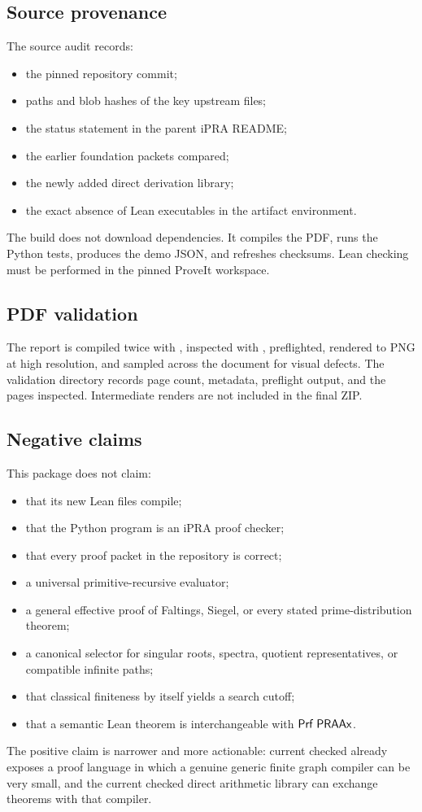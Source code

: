 \subsection{Source provenance}

The source audit records:

\begin{itemize}
\item the pinned repository commit;
\item paths and blob hashes of the key upstream files;
\item the status statement in the parent iPRA README;
\item the earlier foundation packets compared;
\item the newly added direct derivation library;
\item the exact absence of Lean executables in the artifact environment.
\end{itemize}

The build does not download dependencies.  It compiles the PDF, runs the Python
tests, produces the demo JSON, and refreshes checksums.  Lean checking must be
performed in the pinned ProveIt workspace.

\subsection{PDF validation}

The report is compiled twice with , inspected with
, preflighted, rendered to PNG at high resolution, and sampled
across the document for visual defects.  The validation directory records page
count, metadata, preflight output, and the pages inspected.  Intermediate
renders are not included in the final ZIP.

\subsection{Negative claims}

This package does not claim:

\begin{itemize}
\item that its new Lean files compile;
\item that the Python program is an iPRA proof checker;
\item that every proof packet in the repository is correct;
\item a universal primitive-recursive evaluator;
\item a general effective proof of Faltings, Siegel, or every stated
prime-distribution theorem;
\item a canonical selector for singular roots, spectra, quotient
representatives, or compatible infinite paths;
\item that classical finiteness by itself yields a search cutoff;
\item that a semantic Lean theorem is interchangeable with
\(\mathsf{Prf}\;\mathsf{PRAAx}\).
\end{itemize}

The positive claim is narrower and more actionable: current checked
 already exposes a proof language in which a genuine generic
finite graph compiler can be very small, and the current checked direct
arithmetic library can exchange theorems with that compiler.

